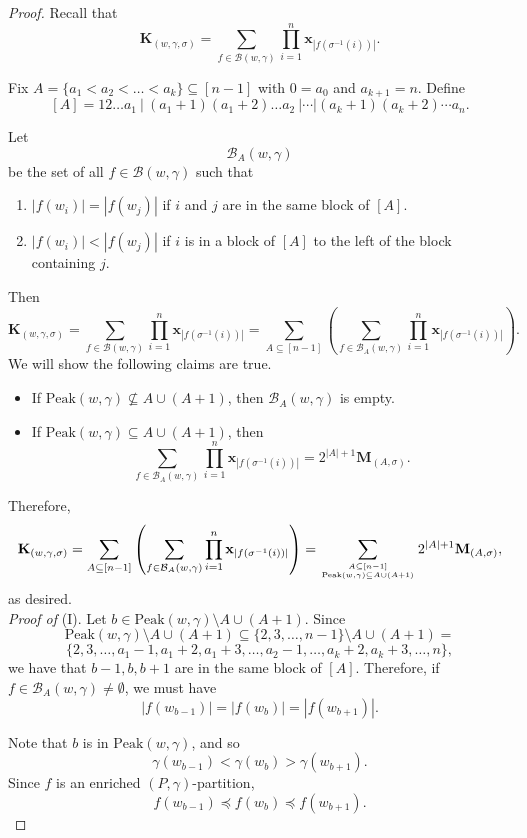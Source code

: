 \documentclass[11pt]{amsart}
\numberwithin{equation}{section}
\newcommand{\peak}{\mathrm{Peak}}
\newcommand{\bfM}{{\mathbf{M}}}
\newcommand{\bfK}{{\mathbf{K}}}
\newcommand{\calB}{{\mathcal{B}}}
\begin{document}
\begin{proof}
Recall that 
$$\bfK_{(w,\gamma,\sigma)}=\sum_{f\in\mathcal{B}(w,\gamma)}\prod_{i=1}^n\mathbf{x}_{|f(\sigma^{-1}(i))|}.$$

Fix $A=\{a_1<a_2<\dots<a_{k}\}\subseteq[n-1]$ with $0=a_0$ and $a_{k+1}=n$. Define 
$$[A]=1 2 \dots  a_1 ~|~ (a_1+1) (a_1+2) \dots a_2~| \cdots |(a_k+1)(a_{k}+2)  \cdots  a_n.$$ 

 Let  $$\mathcal{B}_A(w,\gamma)$$ be the set of all $f\in \mathcal{B}(w,\gamma)$ such that
\begin{enumerate}
\item $|f(w_i)|=|f(w_j)|$ if $i$ and $j$ are in the same block of $[A]$. 
\item $|f(w_i)|<|f(w_j)|$ if $i$ is in a block of $[A]$ to the left of the block containing $j$.
\end{enumerate} 
Then 
$$\bfK_{(w,\gamma,\sigma)}=\sum_{f\in\mathcal{B}(w,\gamma)}\prod_{i=1}^n\mathbf{x}_{|f(\sigma^{-1}(i))|}=\sum_{A\subseteq [n-1]} \left(\sum_{f\in\mathcal{B}_A(w,\gamma)}\prod_{i=1}^n\mathbf{x}_{|f(\sigma^{-1}(i))|}\right).$$
We will show the following claims are true. 
\begin{itemize}
\item[(I)] If  $\peak(w,\gamma)\not\subseteq A\cup (A+1)$, then  $\calB_A(w,\gamma)$ is empty.

\item[(II)] If  $\peak(w,\gamma)\subseteq A\cup (A+1)$, then 
$$\sum_{f\in\mathcal{B}_A(w,\gamma)}\prod_{i=1}^n\mathbf{x}_{|f(\sigma^{-1}(i))|}=2^{|A|+1}\bfM_{(A,\sigma)}.$$
\end{itemize} 
Therefore,  
$$\bfK_{(w,\gamma,\sigma)}=\sum_{A\subseteq [n-1]} \left(\sum_{f\in\mathcal{B}_A(w,\gamma)}\prod_{i=1}^n\mathbf{x}_{|f(\sigma^{-1}(i))|}\right)=\sum_{A\subseteq[n-1] \atop \peak(w,\gamma)\subseteq A\cup (A+1)} 2^{|A|+1}\mathbf{M}_{(A,\sigma)},$$ as desired. 
\\

{\it Proof of }(I). Let $b\in \peak(w,\gamma)\setminus A\cup (A+1)$. Since 
$$ \peak(w,\gamma)\setminus A\cup (A+1)\subseteq \{2,3,\dots,n-1\}\setminus A\cup (A+1)=$$$$\{2,3, \dots, a_{1}-1,a_{1}+2,a_{1}+3,\dots,a_{2}-1,\dots, a_{k}+2,a_{k}+3,\dots,n\},$$
we have that $b-1,b,b+1$ are in the same block of $[A]$. Therefore, if $f\in \calB_A(w,\gamma)\neq\emptyset$, we must have $$|f(w_{b-1})|=|f(w_b)|=|f(w_{b+1})|.$$ 

Note that $b$ is in $\peak(w,\gamma)$, and so $$\gamma(w_{b-1})<\gamma(w_b)>\gamma(w_{b+1}).$$ Since $f$ is an enriched $(P,\gamma)$-partition,   
$$f(w_{b-1})\preceq f(w_b)\preceq f(w_{b+1}).$$


\end{proof}
\end{document}
